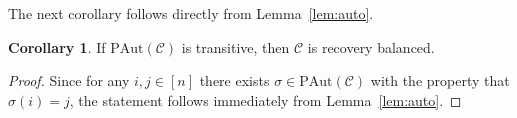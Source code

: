 \documentclass[11pt,a4paper,reqno,twoside]{amsart}
\theoremstyle{definition}
\newtheorem{corollary}{Corollary}
\newtheorem{lemma}{Lemma}
\newcommand{\F}{\mathbb{F}}
\newcommand{\E}{\mathbb{E}}
\newcommand{\mC}{\mathcal{C}}
\newcommand{\pcomment}[1]{{\color{purple}#1}}
\newcommand{\vcomment}[1]{{\color{violet}#1}}
\newcommand{\ey}[1]{{{\footnotesize [\pcomment{#1}\;\;\vcomment{--Eitan}]}}}
\begin{document}

The next corollary follows directly from Lemma~\ref{lem:auto}.
\begin{corollary} \label{cor:paut}
    If $\mbox{PAut}(\mC)$ is transitive, then $\mC$ is recovery balanced.
\end{corollary}
\begin{proof}
    Since for any $i,j \in [n]$ there exists $\sigma \in \mbox{PAut}(\mC)$ with the property that $\sigma(i)=j$, the statement follows immediately from Lemma~\ref{lem:auto}.
\end{proof}
\end{document}
